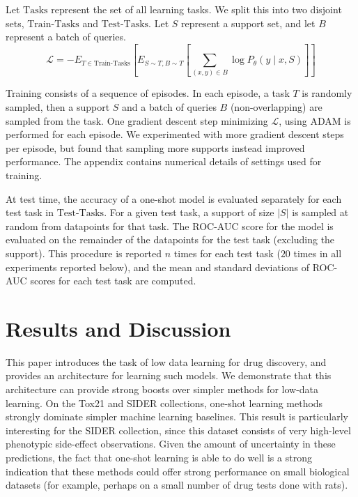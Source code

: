 \documentclass[journal=jacsat,manuscript=article]{achemso}
\begin{document}
Let $\text{Tasks}$ represent the set of all learning tasks. We split this into two disjoint sets, $\text{Train-Tasks}$ and $\text{Test-Tasks}$. Let $S$ represent a support set, and let $B$ represent a batch of queries.
\[
\mathcal{L} = -E_{T\in\text{Train-Tasks}} \left [ E_{S\sim T, B\sim T} \left [ \sum_{(x,y) \in B} \log P_\theta(y\mid x, S) \right ] \right ]
\]

Training consists of a sequence of episodes. In each episode, a task $T$ is randomly sampled, then a support $S$ and a batch of queries $B$ (non-overlapping) are sampled from the task. One gradient descent step minimizing $\mathcal{L}$, using ADAM \cite{kingma2014adam} is performed for each episode. We experimented with more gradient descent steps per episode, but found that sampling more supports instead improved performance. The appendix contains numerical details of settings used for training.

At test time, the accuracy of a one-shot model is evaluated separately for each test task in $\text{Test-Tasks}$. For a given test task, a support of size $|S|$ is sampled at random from datapoints for that task. The ROC-AUC score for the model is evaluated on the remainder of the datapoints for the test task (excluding the support). This procedure is reported $n$ times for each test task ($20$ times in all experiments reported below), and the mean and standard deviations of ROC-AUC scores for each test task are computed. 
  
\section{Results and Discussion}

This paper introduces the task of low data learning for drug discovery, and provides an architecture for learning such models. We demonstrate that this architecture can provide strong boosts over simpler methods for low-data learning. On the Tox21 and SIDER collections, one-shot learning methods strongly dominate simpler machine learning baselines. This result is particularly interesting for the SIDER collection, since this dataset consists of very high-level phenotypic side-effect observations. Given the amount of uncertainty in these predictions, the fact that one-shot learning is able to do well is a strong indication that these methods could offer strong performance on small biological datasets (for example, perhaps on a small number of drug tests done with rats).
\end{document}
